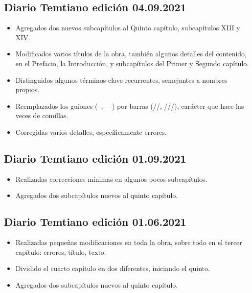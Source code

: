 \documentclass[
]{book}
\begin{document}
\hypertarget{diario-temtiano-ediciuxf3n-04.09.2021}{%
\subsection*{Diario Temtiano edición 04.09.2021}\label{diario-temtiano-ediciuxf3n-04.09.2021}}

\begin{itemize}
\item
  Agregados dos nuevos subcapítulos al Quinto capítulo, subcapítulos XIII y XIV.
\item
  Modificados varios títulos de la obra, también algunos detalles del contenido, en el Prefacio, la Introducción, y subcapítulos del Primer y Segundo capítulo.
\item
  Distinguidos algunos términos clave recurrentes, semejantes a nombres propios.
\item
  Reemplazados los guiones (--, ---) por barras (//, ///), carácter que hace las veces de comillas.
\item
  Corregidas varios detalles, específicamente errores.
\end{itemize}

\hypertarget{diario-temtiano-ediciuxf3n-01.09.2021}{%
\subsection*{Diario Temtiano edición 01.09.2021}\label{diario-temtiano-ediciuxf3n-01.09.2021}}

\begin{itemize}
\item
  Realizadas correcciones mínimas en algunos pocos subcapítulos.
\item
  Agregados dos subcapítulos nuevos al quinto capítulo.
\end{itemize}

\hypertarget{diario-temtiano-ediciuxf3n-01.06.2021}{%
\subsection*{Diario Temtiano edición 01.06.2021}\label{diario-temtiano-ediciuxf3n-01.06.2021}}

\begin{itemize}
\item
  Realizadas pequeñas modificaciones en toda la obra, sobre todo en el tercer capítulo: errores, título, texto.
\item
  Dividido el cuarto capítulo en dos diferentes, iniciando el quinto.
\item
  Agregados dos subcapítulos nuevos al quinto capítulo.
\end{itemize}
\end{document}
